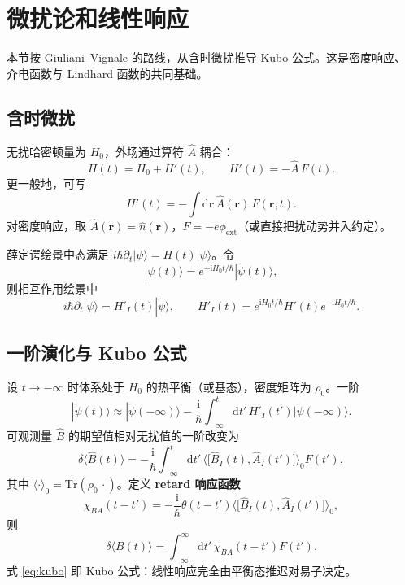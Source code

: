 \section{微扰论和线性响应}

本节按 Giuliani--Vignale 的路线，从含时微扰推导 Kubo 公式。这是密度响应、介电函数与 Lindhard 函数的共同基础。

\subsection{含时微扰}

无扰哈密顿量为 $H_0$，外场通过算符 $\hat A$ 耦合：
\begin{equation}
  H(t)=H_0+H'(t),
  \qquad
  H'(t)=-\hat A\,F(t).
\end{equation}
更一般地，可写
\begin{equation}
  H'(t)
  =-\int\mathrm{d}\mathbf{r}\,
  \hat A(\mathbf{r})\,F(\mathbf{r},t).
\end{equation}
对密度响应，取 $\hat A(\mathbf{r})=\hat n(\mathbf{r})$，$F=-e\phi_{\mathrm{ext}}$（或直接把扰动势并入约定）。

薛定谔绘景中态满足 $i\hbar\partial_t|\psi\rangle=H(t)|\psi\rangle$。令
\begin{equation}
  |\psi(t)\rangle
  =e^{-\mathrm{i}H_0 t/\hbar}|\tilde\psi(t)\rangle,
\end{equation}
则相互作用绘景中
\begin{equation}
  i\hbar\partial_t|\tilde\psi\rangle
  =H'_I(t)|\tilde\psi\rangle,
  \qquad
  H'_I(t)=e^{\mathrm{i}H_0 t/\hbar}H'(t)e^{-\mathrm{i}H_0 t/\hbar}.
\end{equation}

\subsection{一阶演化与 Kubo 公式}

设 $t\to-\infty$ 时体系处于 $H_0$ 的热平衡（或基态），密度矩阵为 $\rho_0$。一阶
\begin{equation}
  |\tilde\psi(t)\rangle
  \approx|\tilde\psi(-\infty)\rangle
  -\frac{\mathrm{i}}{\hbar}
  \int_{-\infty}^{t}\mathrm{d}t'\,
  H'_I(t')|\tilde\psi(-\infty)\rangle.
\end{equation}
可观测量 $\hat B$ 的期望值相对无扰值的一阶改变为
\begin{equation}
  \delta\langle\hat B(t)\rangle
  =-\frac{\mathrm{i}}{\hbar}
  \int_{-\infty}^{t}\mathrm{d}t'\,
  \bigl\langle
  \bigl[\hat B_I(t),\hat A_I(t')\bigr]
  \bigr\rangle_0
  F(t'),
\end{equation}
其中 $\langle\cdot\rangle_0=\mathrm{Tr}(\rho_0\,\cdot)$。定义 \textbf{retard 响应函数}
\begin{equation}
  \chi_{BA}(t-t')
  =-\frac{\mathrm{i}}{\hbar}
  \theta(t-t')
  \bigl\langle
  \bigl[\hat B_I(t),\hat A_I(t')\bigr]
  \bigr\rangle_0,
\label{eq:kubo}
\end{equation}
则
\begin{equation}
  \delta\langle B(t)\rangle
  =\int_{-\infty}^{\infty}\mathrm{d}t'\,
  \chi_{BA}(t-t')F(t').
\end{equation}
式 \eqref{eq:kubo} 即 Kubo 公式：线性响应完全由平衡态推迟对易子决定。

